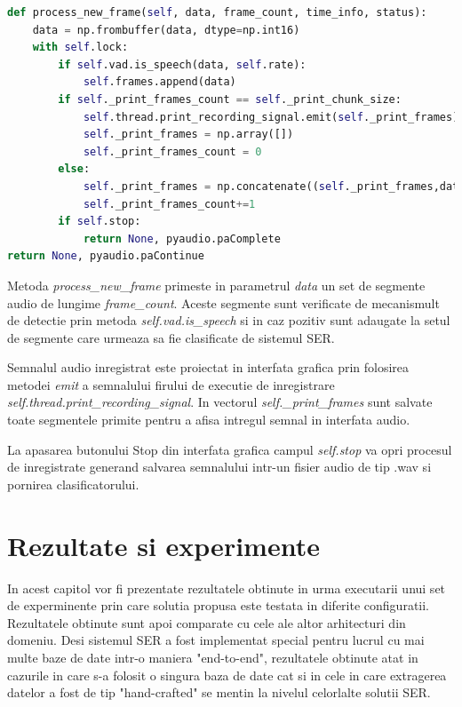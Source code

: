 \documentclass[a4paper,12pt]{book}
\begin{document}
\begin{lstlisting}[language=Python, caption={Procesarea unui nou segmente al semnalului audio inregistrat. Daca segmentul nu contine discurs uman este exclus din inregistrarea finala.}]		
def process_new_frame(self, data, frame_count, time_info, status):
	data = np.frombuffer(data, dtype=np.int16)
	with self.lock:
		if self.vad.is_speech(data, self.rate):
			self.frames.append(data)
		if self._print_frames_count == self._print_chunk_size:
			self.thread.print_recording_signal.emit(self._print_frames)
			self._print_frames = np.array([])
			self._print_frames_count = 0
		else:
			self._print_frames = np.concatenate((self._print_frames,data), axis=0)
			self._print_frames_count+=1
		if self.stop:
			return None, pyaudio.paComplete
return None, pyaudio.paContinue	\end{lstlisting}
		Metoda \textit{process\_new\_frame} primeste in parametrul \textit{data} un set de segmente audio de lungime \textit{frame\_count}. Aceste segmente sunt verificate de mecanismult de detectie prin metoda \textit{self.vad.is\_speech} si in caz pozitiv sunt adaugate la setul de segmente care urmeaza sa fie clasificate de sistemul SER. \par
		Semnalul audio inregistrat este proiectat in interfata grafica prin folosirea metodei \textit{emit} a semnalului firului de executie de inregistrare \textit{self.thread.print\_recording\_signal}. In vectorul \textit{self.\_print\_frames} sunt salvate toate segmentele primite pentru a afisa intregul semnal in interfata audio. \par
		La apasarea butonului Stop din interfata grafica campul \textit{self.stop} va opri procesul de inregistrate generand salvarea semnalului intr-un fisier audio de tip .wav si pornirea clasificatorului.
		
		 
		\chapter{Rezultate si experimente}
		 
		 In acest capitol vor fi prezentate rezultatele obtinute in urma executarii unui set de experminente prin care solutia propusa este testata in diferite configuratii. Rezultatele obtinute sunt apoi comparate cu cele ale altor arhitecturi din domeniu. Desi sistemul SER a fost implementat special pentru lucrul cu mai multe baze de date intr-o maniera "end-to-end", rezultatele obtinute atat in cazurile in care s-a folosit o singura baza de date cat si in cele in care extragerea datelor a fost de tip "hand-crafted" se mentin la nivelul celorlalte solutii SER.\par
			
\end{document}
